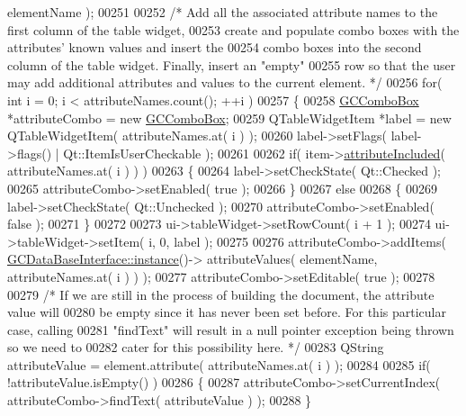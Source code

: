 \begin{DoxyCode}
      elementName );
00251 
00252     \textcolor{comment}{/* Add all the associated attribute names to the first column of the table
       widget,}
00253 \textcolor{comment}{    create and populate combo boxes with the attributes' known values and
       insert the}
00254 \textcolor{comment}{    combo boxes into the second column of the table widget. Finally, insert an
       "empty"}
00255 \textcolor{comment}{    row so that the user may add additional attributes and values to the
       current element. */}
00256     \textcolor{keywordflow}{for}( \textcolor{keywordtype}{int} i = 0; i < attributeNames.count(); ++i )
00257     \{
00258       \hyperlink{class_g_c_combo_box}{GCComboBox} *attributeCombo = \textcolor{keyword}{new} \hyperlink{class_g_c_combo_box}{GCComboBox};
00259       QTableWidgetItem *label = \textcolor{keyword}{new} QTableWidgetItem( attributeNames.at( i ) );
00260       label->setFlags( label->flags() | Qt::ItemIsUserCheckable );
00261 
00262       \textcolor{keywordflow}{if}( item->\hyperlink{class_g_c_tree_widget_item_a91d71330acb400242d45b6d74c7e0f87}{attributeIncluded}( attributeNames.at( i ) ) )
00263       \{
00264         label->setCheckState( Qt::Checked );
00265         attributeCombo->setEnabled( \textcolor{keyword}{true} );
00266       \}
00267       \textcolor{keywordflow}{else}
00268       \{
00269         label->setCheckState( Qt::Unchecked );
00270         attributeCombo->setEnabled( \textcolor{keyword}{false} );
00271       \}
00272 
00273       ui->tableWidget->setRowCount( i + 1 );
00274       ui->tableWidget->setItem( i, 0, label );
00275 
00276       attributeCombo->addItems( \hyperlink{class_g_c_data_base_interface_a1baea9c0667aa8b610ec30076fcab84c}{GCDataBaseInterface::instance}()->
      attributeValues( elementName, attributeNames.at( i ) ) );
00277       attributeCombo->setEditable( \textcolor{keyword}{true} );
00278 
00279       \textcolor{comment}{/* If we are still in the process of building the document, the attribute
       value will}
00280 \textcolor{comment}{      be empty since it has never been set before.  For this particular case,
       calling}
00281 \textcolor{comment}{      "findText" will result in a null pointer exception being thrown so we
       need to}
00282 \textcolor{comment}{      cater for this possibility here. */}
00283       QString attributeValue = element.attribute( attributeNames.at( i ) );
00284 
00285       \textcolor{keywordflow}{if}( !attributeValue.isEmpty() )
00286       \{
00287         attributeCombo->setCurrentIndex( attributeCombo->findText( 
      attributeValue ) );
00288       \}

\end{DoxyCode}
